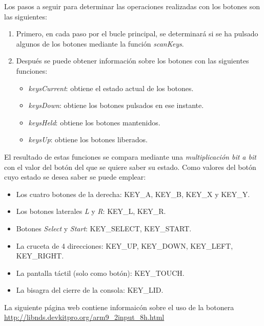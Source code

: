 Los pasos a seguir para determinar las operaciones realizadas con los botones son las siguientes:
\begin{enumerate}
\item Primero, en cada paso por el bucle principal, se determinará si se ha pulsado algunos de los botones mediante la función \textit{scanKeys}. 
%
\item Después se puede  obtener información sobre los botones con las siguientes funciones:
\begin{itemize}
	\item \textit{keysCurrent}: obtiene el estado actual de los botones.
	\item \textit{keysDown}: obtiene los botones pulsados en ese instante.
	\item \textit{keysHeld}: obtiene los botones mantenidos.
	\item \textit{keysUp}: obtiene los botones liberados.
\end{itemize}
\end{enumerate}

El resultado de estas funciones se compara mediante una \textit{multiplicación bit a bit} con el valor del botón del que se quiere saber su estado. Como valores del botón cuyo estado se desea saber se puede emplear: 
\begin{itemize}
\item Los cuatro botones de la derecha: KEY\_A, KEY\_B, KEY\_X y KEY\_Y.
\item Los botones laterales \textit{L} y \textit{R}: KEY\_L, KEY\_R.
\item Botones \textit{Select} y \textit{Start}: KEY\_SELECT, KEY\_START.
\item La cruceta de 4 direcciones: KEY\_UP, KEY\_DOWN, KEY\_LEFT, KEY\_RIGHT.
\item La pantalla táctil (solo como botón): KEY\_TOUCH.
\item La bisagra del cierre de la consola: KEY\_LID.
\end{itemize}

La siguiente página web contiene informaicón sobre el uso de la botonera \url{http://libnds.devkitpro.org/arm9_2input_8h.html}

